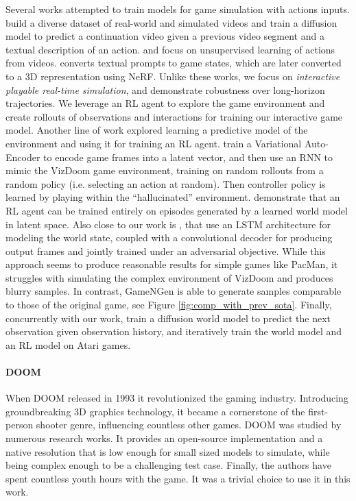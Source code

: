\documentclass{article} %
\begin{document}
Several works attempted to train models for game simulation with actions inputs. \cite{yang2023learning} build a diverse dataset of real-world and simulated videos and train a diffusion model to predict a continuation video given a previous video segment and a textual description of an action. \cite{menapace2021playablevideogeneration} and \cite{bruce2024genie} focus on unsupervised learning of actions from videos. \cite{Menapace_2024} converts textual prompts to game states, which are later converted to a 3D representation using NeRF.
Unlike these works, we focus on \textit{interactive playable real-time simulation}, and demonstrate robustness over long-horizon trajectories. We leverage an RL agent to explore the game environment and create rollouts of observations and interactions for training our interactive game model.
Another line of work explored learning a predictive model of the environment and using it for training an RL agent. \cite{ha2018worldmodels} train a Variational Auto-Encoder \citep{Kingma2014} to encode game frames into a latent vector, and then use an RNN to mimic the VizDoom game environment, training on random rollouts from a random policy (i.e. selecting an action at random). Then controller policy is learned by playing within the ``hallucinated'' environment. \cite{hafner2020dreamer} demonstrate that an RL agent can be trained entirely on episodes generated by a learned world model in latent space.
Also close to our work is \cite{Kim2020_GameGan}, that use an LSTM architecture for modeling the world state, coupled with a convolutional decoder for producing output frames and jointly trained under an adversarial objective. While this approach seems to produce reasonable results for simple games like PacMan, it struggles with simulating the complex environment of VizDoom and produces blurry samples. In contrast, GameNGen is able to generate samples comparable to those of the original game, see  Figure \ref{fig:comp_with_prev_sota}.
Finally, concurrently with our work, \cite{alonso2024diffusion} train a diffusion world model to predict the next observation given observation history, and iteratively train the world model and an RL model on Atari games.

\paragraph{DOOM}

When DOOM released in 1993 it revolutionized the gaming industry.
Introducing groundbreaking 3D graphics technology, it became a cornerstone of the first-person shooter genre, influencing countless other games.
DOOM was studied by numerous research works.
It provides an open-source implementation and a native resolution that is low enough for small sized models to simulate, while being complex enough to be a challenging test case.
Finally, the authors have spent countless youth hours with the game.
It was a trivial choice to use it in this work.
\end{document}
